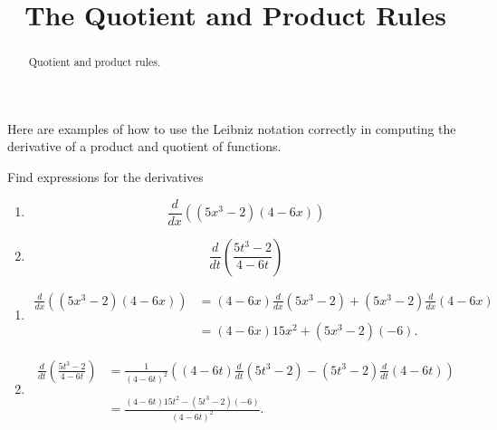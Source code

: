 \documentclass{ximera}
\title{The Quotient and Product Rules}
\begin{document}
\begin{abstract}
Quotient and product rules.
\end{abstract}
\maketitle

Here are examples of how to use the Leibniz notation correctly in computing the derivative of a product and quotient of functions.

\begin{example} \label{Edfhnhhthgg}

Find expressions for the derivatives

\begin{enumerate}

\item 
\[
   \frac{d}{dx} \left( (5x^3-2)(4 - 6x)  \right)
\]

\item 
\[
  \frac{d}{dt} \left( \frac{5t^3-2}{4 - 6t}  \right)
\]
\end{enumerate}

\begin{explanation}
\begin{enumerate}

\item 
\begin{align*}
\frac{d}{dx} \left( (5x^3-2)(4 - 6x)  \right)  &= (4-6x)\frac{d}{dx} \left( 5x^3-2 \right) + (5x^3-2)   \frac{d}{dx} \left( 4-6x \right)    \\ \\
              &= (4-6x) 15x^2+ (5x^3-2) (-6) .
\end{align*}

\item 

\begin{align*}
\frac{d}{dt} \left( \frac{5t^3-2}{4 - 6t}  \right)  &=\frac{1}{(4-6t)^2} \left( (4-6t) \frac{d}{dt} \left( 5t^3-2 \right)  - (5t^3-2)   \frac{d}{dt} \left( 4-6t \right)   \right)  \\ \\
              &= \frac{(4-6t) 15t^2 - (5t^3-2) (-6)}{(4-6t)^2} .
\end{align*}


\end{enumerate}

\end{explanation}

\end{example}
\end{document}
